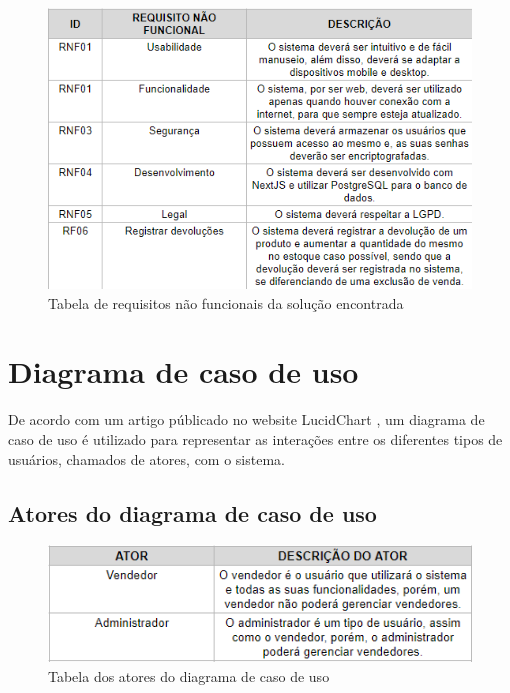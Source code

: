 \documentclass[serif, english, brazilian, oneside]{uffstex}
\begin{document}
\begin{figure}[!htpb]
    \centering
    \caption{Tabela de requisitos não funcionais da solução encontrada}
    \label{fig:req_nao_funcionais}
    \includegraphics[width=\linewidth]{imagens/req_nao_funcionais.png}
\end{figure}

\section{Diagrama de caso de uso}

De acordo com um artigo públicado no website LucidChart \cite{diagrama-de-caso-de-uso}, um diagrama de caso de uso é utilizado para representar as interações entre os diferentes tipos de usuários, chamados de atores, com o sistema.

\subsection{Atores do diagrama de caso de uso}

\begin{figure}[!htpb]
    \centering
    \caption{Tabela dos atores do diagrama de caso de uso}
    \label{fig:atores_caso_uso}
    \includegraphics[width=0.7\linewidth]{imagens/atores_diagrama_caso_uso.png}
\end{figure}


\printbibliography[heading=abnt]
\end{document}
